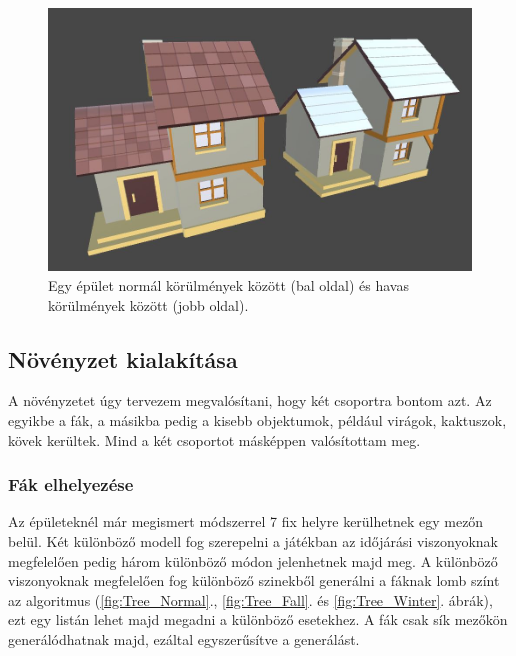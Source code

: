 \begin{figure}[h!]
\centering
\includegraphics[scale=0.3]{kepek/Buildings.JPG}
\caption[épület]{Egy épület normál körülmények között (bal oldal) és havas körülmények között (jobb oldal). \footnotemark}
\label{fig:Buildings}
\end{figure}


\subsection{Növényzet kialakítása}

A növényzetet úgy tervezem megvalósítani, hogy két csoportra bontom azt. Az egyikbe a fák, a másikba pedig a kisebb objektumok, például virágok, kaktuszok, kövek kerültek. Mind a két csoportot másképpen valósítottam meg.

\subsubsection{Fák elhelyezése}

Az épületeknél már megismert módszerrel 7 fix helyre kerülhetnek egy mezőn belül. Két különböző modell fog szerepelni a játékban az időjárási viszonyoknak megfelelően pedig három különböző módon jelenhetnek majd meg. A különböző viszonyoknak megfelelően fog különböző szinekből generálni a fáknak lomb színt az algoritmus (\ref{fig:Tree_Normal}., \ref{fig:Tree_Fall}. és \ref{fig:Tree_Winter}. ábrák), ezt egy listán lehet majd megadni a különböző esetekhez. A fák csak sík mezőkön generálódhatnak majd, ezáltal egyszerűsítve a generálást.

